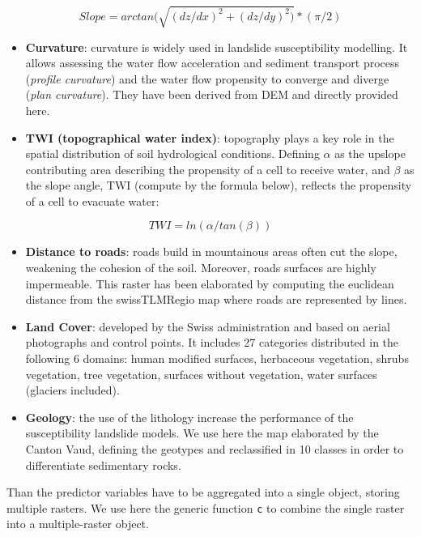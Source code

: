 \documentclass[
]{article}
\begin{document}
\[Slope = arctan(\sqrt{(dz/dx)^2 + (dz/dy)^2)} * (\pi/2)\]

\begin{itemize}
\item
  \textbf{Curvature}: curvature is widely used in landslide susceptibility modelling.
  It allows assessing the water flow acceleration and sediment transport process (\emph{profile curvature}) and the water flow propensity to converge and diverge (\emph{plan curvature}).
  They have been derived from DEM and directly provided here.
\item
  \textbf{TWI (topographical water index)}: topography plays a key role in the spatial distribution of soil hydrological conditions.
  Defining \(\alpha\) as the upslope contributing area describing the propensity of a cell to receive water, and \(\beta\) as the slope angle, TWI (compute by the formula below), reflects the propensity of a cell to evacuate water:
\end{itemize}

\[TWI=ln(\alpha/tan(\beta))\]

\begin{itemize}
\item
  \textbf{Distance to roads}: roads build in mountainous areas often cut the slope, weakening the cohesion of the soil.
  Moreover, roads surfaces are highly impermeable.
  This raster has been elaborated by computing the euclidean distance from the swissTLMRegio map where roads are represented by lines.
\item
  \textbf{Land Cover}: developed by the Swiss administration and based on aerial photographs and control points.
  It includes 27 categories distributed in the following 6 domains: human modified surfaces, herbaceous vegetation, shrubs vegetation, tree vegetation, surfaces without vegetation, water surfaces (glaciers included).
\item
  \textbf{Geology}: the use of the lithology increase the performance of the susceptibility landslide models.
  We use here the map elaborated by the Canton Vaud, defining the geotypes and reclassified in 10 classes in order to differentiate sedimentary rocks.
\end{itemize}

Than the predictor variables have to be aggregated into a single object, storing multiple rasters.
We use here the generic function \texttt{c} to combine the single raster into a multiple-raster object.
\end{document}
